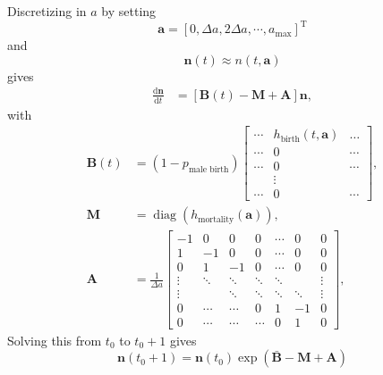 \documentclass[12pt]{article}
\renewcommand{\vec}[1]{\mathbf{#1}}
\newcommand{\mat}[1]{\mathbf{#1}}
\newcommand{\md}{\mathrm{d}}
\newcommand{\mT}{\mathrm{T}}
\begin{document}
Discretizing in $a$ by setting
\begin{equation}
  \label{eq:11}
  \vec{a} = \left[0, \Delta a, 2 \Delta a, \cdots, a_{\text{max}} \right]^{\mT}
\end{equation}
and
\begin{equation}
  \vec{n}(t) \approx n(t, \vec{a})
\end{equation}
gives
\begin{equation}
  \begin{split}
    \frac{\md \vec{n}}{\md t} &=
    \left[\mat{B}(t)
      - \mat{M}
      + \mat{A}\right] \vec{n},
  \end{split}
\end{equation}
with
\begin{equation}
  \begin{split}
    \mat{B}(t)
    &=
    (1 - p_{\text{male birth}})
    \begin{bmatrix}
      \cdots & h_{\text{birth}}(t, \vec{a}) & \dots
      \\
      \cdots & 0 & \cdots
      \\
      \cdots & 0 & \cdots
      \\
      & \vdots &
      \\
      \cdots & 0 & \cdots
    \end{bmatrix},
    \\
    \mat{M} &=
    \operatorname{diag}\left(h_{\text{mortality}}(\vec{a})\right),
    \\
    \mat{A} &=
    \frac{1}{\Delta a}
    \begin{bmatrix}
      -1 & 0 & 0 & 0 & \cdots & 0 & 0
      \\
      1 & -1 & 0 & 0 & \cdots & 0 & 0
      \\
      0 & 1 & -1 & 0 & \cdots & 0 & 0
      \\
      \vdots & \ddots & \ddots & \ddots & \ddots &  & \vdots
      \\
      \vdots &  & \ddots & \ddots & \ddots & \ddots & \vdots
      \\
      0  & \cdots & \cdots & 0 & 1 & - 1 & 0
      \\
      0  & \cdots & \cdots & \cdots & 0 & 1 & 0
    \end{bmatrix},
  \end{split}
\end{equation}
Solving this from $t_0$ to $t_0 + 1$ gives
\begin{equation}
  \vec{n}(t_0 + 1) = \vec{n}(t_0)
  \exp\left(\bar{\mat{B}} - \mat{M} + \mat{A}\right)
\end{equation}
\end{document}
